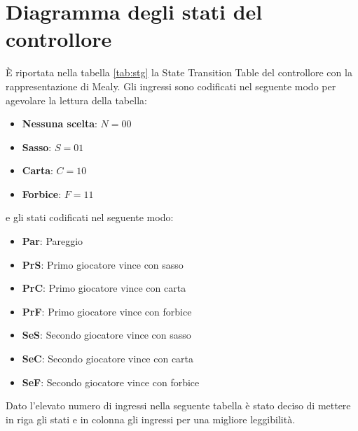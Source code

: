 \documentclass[a4paper]{article}
\begin{document}
\section{Diagramma degli stati del controllore}
È riportata nella tabella \ref{tab:stg} la State Transition Table del controllore con la rappresentazione di Mealy.
Gli ingressi sono codificati nel seguente modo per agevolare la lettura della tabella:
\begin{itemize}
	\item \textbf{Nessuna scelta}: $N = 00$
	\item \textbf{Sasso}: $S = 01$
	\item \textbf{Carta}: $C = 10$
	\item \textbf{Forbice}: $F = 11$
\end{itemize}
e gli stati codificati nel seguente modo:
\begin{itemize}
	\item \textbf{Par}: Pareggio
	\item \textbf{PrS}: Primo giocatore vince con sasso
	\item \textbf{PrC}: Primo giocatore vince con carta
	\item \textbf{PrF}: Primo giocatore vince con forbice
	\item \textbf{SeS}: Secondo giocatore vince con sasso
	\item \textbf{SeC}: Secondo giocatore vince con carta
	\item \textbf{SeF}: Secondo giocatore vince con forbice
\end{itemize}
Dato l'elevato numero di ingressi nella seguente tabella è stato deciso di mettere in riga gli stati e in
colonna gli ingressi per una migliore leggibilità.
\end{document}
